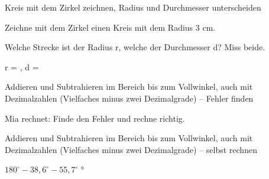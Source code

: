 \begin{aufgabe}{Kreis mit dem Zirkel zeichnen, Radius und Durchmesser unterscheiden}
\begin{teile}
\teil Zeichne mit dem Zirkel einen Kreis mit dem Radius 3 cm.

\begin{ksys}[xmin=0,xmax=10,ymin=0,ymax=6] \end{ksys}
\teil Welche Strecke ist der Radius r, welche der Durchmesser d? Miss beide.

\begin{kreis}[2]    \end{kreis}
r = \leerfeld[cm] , d = \leerfeld[cm]
\end{teile}
\end{aufgabe}

\begin{aufgabe}{Addieren und Subtrahieren im Bereich bis zum Vollwinkel, auch mit Dezimalzahlen (Vielfaches minus zwei Dezimalgrade) – Fehler finden}
\begin{teile}
\teil Mia rechnet:  Finde den Fehler und rechne richtig.
\end{teile}
\end{aufgabe}

\begin{aufgabe}{Addieren und Subtrahieren im Bereich bis zum Vollwinkel, auch mit Dezimalzahlen (Vielfaches minus zwei Dezimalgrade) – selbst rechnen}
\begin{teile}
\teil $180^\circ - 38{,}6^\circ - 55{,}7^\circ$ \leerfeld °
\end{teile}
\end{aufgabe}
